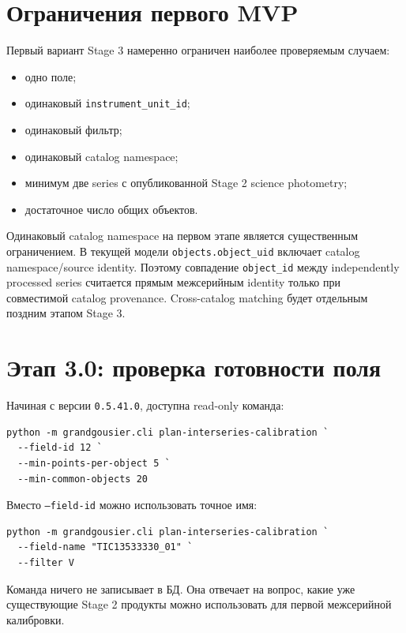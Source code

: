 \section{Ограничения первого MVP}

Первый вариант Stage 3 намеренно ограничен наиболее проверяемым случаем:

\begin{itemize}
  \item одно поле;
  \item одинаковый \texttt{instrument\_unit\_id};
  \item одинаковый фильтр;
  \item одинаковый catalog namespace;
  \item минимум две series с опубликованной Stage 2 science photometry;
  \item достаточное число общих объектов.
\end{itemize}

Одинаковый catalog namespace на первом этапе является существенным ограничением. В текущей модели \texttt{objects.object\_uid} включает catalog namespace/source identity. Поэтому совпадение \texttt{object\_id} между independently processed series считается прямым межсерийным identity только при совместимой catalog provenance. Cross-catalog matching будет отдельным поздним этапом Stage 3.

\section{Этап 3.0: проверка готовности поля}

Начиная с версии \texttt{0.5.41.0}, доступна read-only команда:

\begin{lstlisting}
python -m grandgousier.cli plan-interseries-calibration `
  --field-id 12 `
  --min-points-per-object 5 `
  --min-common-objects 20
\end{lstlisting}

Вместо \texttt{--field-id} можно использовать точное имя:

\begin{lstlisting}
python -m grandgousier.cli plan-interseries-calibration `
  --field-name "TIC13533330_01" `
  --filter V
\end{lstlisting}

Команда ничего не записывает в БД. Она отвечает на вопрос, какие уже существующие Stage 2 продукты можно использовать для первой межсерийной калибровки.

